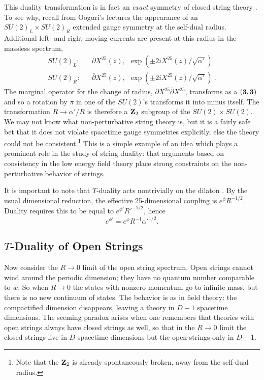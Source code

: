 \documentclass[12pt]{article}
\def\be{\begin{equation}}
\def\ee{\end{equation}}
\def\bea{\begin{eqnarray}}
\def\eea{\end{eqnarray}}
\def\ap{\alpha'}
\newcommand{\zb}{{\bar{z}}}
\begin{document}
This duality transformation is in fact an {\it exact} symmetry of closed 
string theory \cite{dhs}.  To see why, recall from Ooguri's lectures
the appearance of an $SU(2)_L \times SU(2)_R$ extended gauge symmetry 
at the self-dual radius.  Additional left- and right-moving 
currents are present at this radius in the massless
spectrum, 
\bea
SU(2)_L\colon&&\partial X^{25}(z),\ \ \exp(\pm 2iX^{25}(z)/\sqrt{\ap})
\nonumber\\
SU(2)_R\colon&&\bar\partial X^{25}(z),\ \ \exp(\pm 2iX^{25}(\zb)/\sqrt{\ap})\
.
\eea
The marginal operator for the change of radius, $\partial X^{25} 
{\bar\partial} X^{25}$, transforms as a $({\bf 3},{\bf 3})$ and so a
rotation by $\pi$ in one of the $SU(2)$'s transforms it into minus itself.
The
transformation $R \to \ap/R$ is therefore a ${\bf Z}_2$ subgroup of
the $SU(2) \times SU(2)$.  We may not know what non-perturbative string
theory is, but it is a fairly safe bet that it does not violate spacetime
gauge symmetries explicitly, else the theory could not be
consistent.\footnote{Note that the ${\bf Z}_2$ is already spontaneously
broken, away from the self-dual radius.}  This is a simple example of an
idea which plays a prominent role in the study of string duality: that
arguments based on consistency in the low energy field theory place strong
constraints on the non-perturbative behavior of strings.

It is important to note that $T$-duality acts nontrivially on the
dilaton \cite{gvb}. By the usual dimensional reduction, the effective
25-dimensional coupling is
$e^{\phi} R^{-1/2}$.  Duality requires this to be equal to 
$e^{\phi'} R'^{-1/2}$, hence
\be
e^{\phi'} = e^{\phi} R^{-1} {\ap}^{1/2}. \label{tdil}
\ee

\subsection{$T$-Duality of Open Strings}

Now consider the $R \to 0$ limit of the open string spectrum.  Open
strings cannot wind around the periodic dimension; they have no quantum
number comparable to $w$.  So when $R \to 0$ the states with nonzero
momentum go to infinite mass, but there is no new continuum of states.
The behavior is as in field theory: the compactified dimension disappears,
leaving a theory in $D-1$ spacetime dimensions.  The seeming paradox
arises when one remembers that theories with open strings always have
closed strings as well, so that in the $R\to 0$ limit the closed strings
live in $D$ spacetime dimensions but the open strings only in $D-1$.
\end{document}
